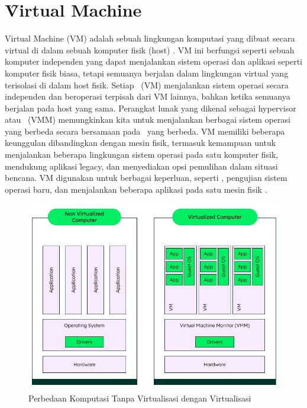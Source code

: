 \section{\f{Virtual Machine}}

Virtual Machine (VM) adalah sebuah lingkungan komputasi yang dibuat secara virtual di dalam sebuah komputer fisik (host) \cite{Pradilla2016}. VM ini berfungsi seperti sebuah komputer independen yang dapat menjalankan sistem operasi dan aplikasi seperti komputer fisik biasa, tetapi semuanya berjalan dalam lingkungan virtual yang terisolasi di dalam host fisik. Setiap \vm\ (VM) menjalankan sistem operasi secara independen dan beroperasi terpisah dari VM lainnya, bahkan ketika semuanya berjalan pada host yang sama. Perangkat lunak yang dikenal sebagai hypervisor atau \vmm\ (VMM) memungkinkan kita untuk menjalankan berbagai sistem operasi yang berbeda secara bersamaan pada \vm\ yang berbeda. VM memiliki beberapa keunggulan dibandingkan dengan mesin fisik, termasuk kemampuan untuk menjalankan beberapa lingkungan sistem operasi pada satu komputer fisik, mendukung aplikasi \f{legacy}, dan menyediakan opsi pemulihan dalam situasi bencana. VM digunakan untuk berbagai keperluan, seperti \cc, pengujian sistem operasi baru, dan menjalankan beberapa aplikasi pada satu mesin fisik \cite{ibmWhatVirtualMachine}.

\begin{figure}
	\centering
	\includegraphics[width=1\textwidth]
	{assets/pics/vm-diagram.jpg}
	\caption{Perbedaan Komputasi Tanpa Virtualisasi dengan Virtualisasi}
	\label{fig:vm-diagram}
\end{figure}

